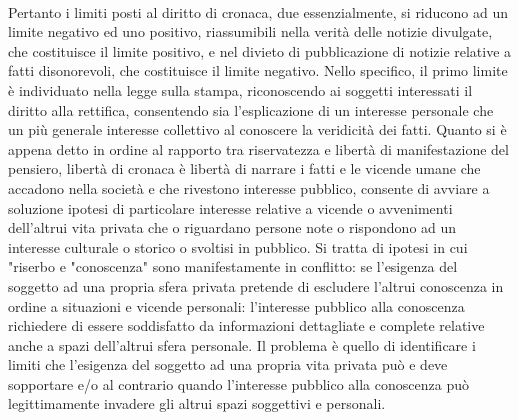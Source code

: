 \\Pertanto i limiti posti al diritto di cronaca, due essenzialmente, si riducono ad un limite negativo ed uno positivo, riassumibili nella verità delle notizie divulgate, che costituisce il limite positivo, e nel divieto di pubblicazione di notizie relative a fatti disonorevoli, che costituisce il limite negativo.
Nello specifico, il primo limite è individuato nella legge sulla stampa, riconoscendo ai soggetti interessati il diritto alla rettifica, consentendo sia l'esplicazione di un interesse personale che un più generale interesse collettivo al conoscere la veridicità dei fatti.
Quanto si è appena detto in ordine al rapporto tra riservatezza e libertà di manifestazione del pensiero, libertà di cronaca è libertà di narrare i fatti e le vicende umane che accadono nella società e che rivestono interesse pubblico, consente di avviare a soluzione ipotesi di particolare interesse relative a vicende o avvenimenti dell'altrui vita privata che o riguardano persone note o rispondono ad un interesse culturale o storico o svoltisi in pubblico. 
Si tratta di ipotesi in cui "riserbo e "conoscenza" sono manifestamente in conflitto: se l'esigenza del soggetto ad una propria sfera privata pretende di escludere l'altrui conoscenza in ordine a situazioni e vicende personali: l'interesse pubblico alla conoscenza richiedere di essere soddisfatto da informazioni dettagliate e complete relative anche a spazi dell'altrui sfera personale. 
Il problema è quello di identificare i limiti che l'esigenza del soggetto ad una propria vita privata può e deve sopportare e/o al contrario quando l'interesse pubblico alla conoscenza può legittimamente invadere gli altrui spazi soggettivi e personali.


